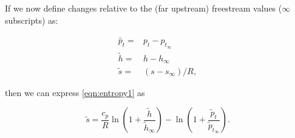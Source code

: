 




If we now define changes relative to the (far upstream) freestream values (\(\infty\) subscripts) as:

\begin{align}
    \widetilde{p_t} =& p_t - p_{t_\infty} \\
    \widetilde{h} =& h - h_\infty \\
    \widetilde{s} =& (s - s_\infty)/R,
\end{align}

\noindent then we can express \cref{eqn:entropy1} as


\begin{equation}
    \label{eqn:entropy2}
    \widetilde{s} = \frac{c_p}{R} \ln\left(1+\frac{\widetilde{h}}{\widetilde{h}_\infty}\right) - \ln\left(1+\frac{\widetilde{p}_t}{\widetilde{p}_{t_\infty}}\right).
\end{equation}

